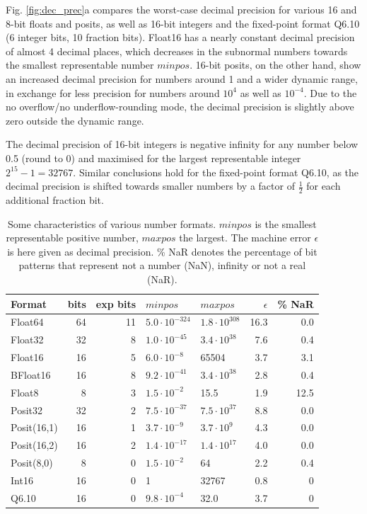 \documentclass[draft]{agujournal2019}
\begin{document}
Fig. \ref{fig:dec_prec}a compares the worst-case decimal precision for various 16 and 8-bit floats and posits, as well as 16-bit integers and the fixed-point format Q6.10 (6 integer bits, 10 fraction bits). Float16 has a nearly constant decimal precision of almost 4 decimal places, which decreases in the subnormal numbers towards the smallest representable number $minpos$. 16-bit posits, on the other hand, show an increased decimal precision for numbers around 1 and a wider dynamic range, in exchange for less precision for numbers around $10^4$ as well as $10^{-4}$. Due to the no overflow/no underflow-rounding mode, the decimal precision is slightly above zero outside the dynamic range.

The decimal precision of 16-bit integers is negative infinity for any number below 0.5 (round to 0) and maximised for the largest representable integer $2^{15} - 1 =  32767$. Similar conclusions hold for the fixed-point format Q6.10, as the decimal precision is shifted towards smaller numbers by a factor of $\tfrac{1}{2}$ for each additional fraction bit.

\begin{table}[htbp]
\center
\begin{tabular}{l | r | r | l | l | r | r}
Format & bits & exp bits & $minpos$ & $maxpos$ & $\epsilon$ &  \% NaR \\
\hline
Float64	& 64 & 11 & $5.0 \cdot 10^{-324}$ & $1.8 \cdot 10^{308}$  & 16.3 & 0.0 \\
Float32	& 32 & 8 & $1.0 \cdot 10^{-45}$ & $3.4 \cdot 10^{38}$ & 7.6 & 0.4 \\
Float16	& 16 & 5 & $6.0 \cdot 10^{-8}$ & 65504 & 3.7 & 3.1 \\
BFloat16	& 16 & 8 & $ 9.2 \cdot 10^{-41}$ & $3.4 \cdot 10^{38}$ & 2.8 & 0.4  \\
Float8 & 8 & 3 & $1.5 \cdot 10^{-2}$ & 15.5 & 1.9 &12.5\\
\hline
Posit32	& 32 & 2 &  $7.5 \cdot 10^{-37}$ & $7.5 \cdot 10^{37}$ & 8.8 & 0.0 \\
Posit(16,1) & 16 & 1 & $3.7 \cdot 10^{-9}$ & $3.7 \cdot 10^{9}$ & 4.3 & 0.0\\
Posit(16,2) & 16 & 2 & $1.4 \cdot 10^{-17}$ & $1.4 \cdot 10^{17}$ & 4.0 & 0.0\\
Posit(8,0) & 8 & 0 & $1.5 \cdot 10^{-2}$ & 64 & 2.2 & 0.4  \\
\hline
Int16 & 16 & 0 & 1 & 32767 & 0.8 & 0\\
Q6.10 & 16 & 0 & $9.8 \cdot 10^{-4}$ & 32.0 & 3.7 & 0
\end{tabular}
\vspace{10pt}
\caption{Some characteristics of various number formats. $minpos$ is the smallest representable positive number, $maxpos$ the largest. The machine error $\epsilon$ is here given as decimal precision. \% NaR denotes the percentage of bit patterns that represent not a number (NaN), infinity or not a real (NaR).}
\label{tab:formats}
\end{table}
\end{document}
